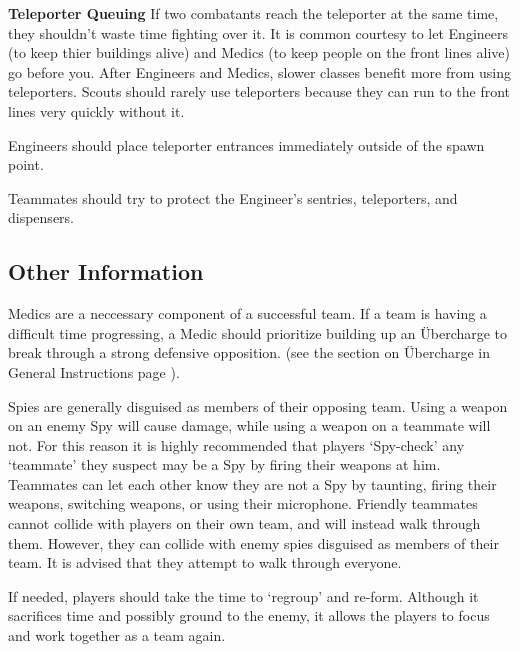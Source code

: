 \textbf{Teleporter Queuing}  If two combatants reach the teleporter at the same time, they shouldn't waste time fighting over it. It is common courtesy to let Engineers (to keep thier buildings alive) and Medics (to keep people on the front lines alive) go before you. After Engineers and Medics, slower classes benefit more from using teleporters. Scouts should rarely use teleporters because they can run to the front lines very quickly without it.

Engineers should place teleporter entrances immediately outside of the spawn point. 

Teammates should try to protect the Engineer's sentries, teleporters, and dispensers.

\subsection{Other Information}
Medics are a neccessary component of a successful team. If a team is having a difficult time progressing, a Medic should prioritize building up an Übercharge to break through a strong defensive opposition. (see the section on Übercharge in General Instructions page \pageref{Ubercharge}).

Spies are generally disguised as members of their opposing team. Using a weapon on an enemy Spy will cause damage, while using a weapon on a teammate will not. For this reason it is highly recommended that players `Spy-check' any `teammate' they suspect may be a Spy by firing their weapons at him. Teammates can let each other know they are not a Spy by taunting, firing their weapons, switching weapons, or using their microphone. Friendly teammates cannot collide with players on their own team, and will instead walk through them. However, they can collide with enemy spies disguised as members of their team. It is advised that they attempt to walk through everyone.

If needed, players should take the time to `regroup' and re-form. Although it sacrifices time and possibly ground to the enemy, it allows the players to focus and work together as a team again.